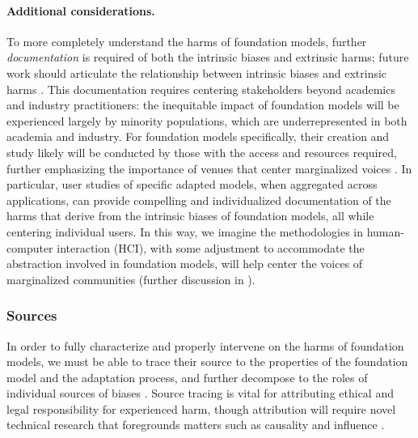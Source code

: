 \paragraph{Additional considerations.}
To more completely understand the harms of foundation models, further \textit{documentation} is required of both the intrinsic biases and extrinsic harms; future work should articulate the relationship between intrinsic biases and extrinsic harms \citep{blodgett_language_2020, blodgett2021, goldfarb-tarrant2021}.
This documentation requires centering stakeholders beyond academics and industry practitioners: the inequitable impact of foundation models will be experienced largely by minority populations, which are underrepresented in both academia and industry. 
For foundation models specifically, their creation and study likely will be conducted by those with the access and resources required, further emphasizing the importance of venues that center marginalized voices \citep[][]{datafeminism}.
In particular, user studies of specific adapted models, when aggregated across applications, can provide compelling and individualized documentation of the harms that derive from the intrinsic biases of foundation models, all while centering individual users.
In this way, we imagine the methodologies in human-computer interaction (HCI), with some adjustment to accommodate the abstraction involved in foundation models, will help center the voices of marginalized communities (further discussion in ). 

\subsubsection{Sources}
\label{sec:fairness-sources}
In order to fully characterize and properly intervene on the harms of foundation models, we must be able to trace their source to the properties of the foundation model and the adaptation process, and further decompose to the roles of individual sources of biases \citep{friedman1996}. 
Source tracing is vital for attributing ethical and legal responsibility for experienced harm, though attribution will require novel technical research that foregrounds matters such as causality \citep{pearl2000causality} and influence \citep{koh2017understanding}.

